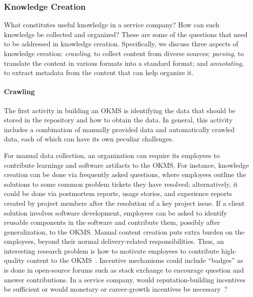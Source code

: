 
\subsubsection{Knowledge Creation}

What constitutes useful knowledge in a service company? How can such knowledge
be collected and organized? These are some of the questions that need to be
addressed in knowledge creation. Specifically, we discuss three aspects of
knowledge creation: \textit{crawling}, to collect content from diverse
sources; \textit{parsing}, to translate the content in various formats into a
standard format; and \textit{annotating}, to extract metadata from the content
that can help organize it.

\vskip -5pt
\paragraph*{Crawling} The first activity in building an OKMS is
identifying the data that should be stored in the repository and how to obtain
the data. In general, this activity includes a combination of manually provided
data and automatically crawled data, each of which can have its own peculiar
challenges.

For manual data collection, an organization can require its employees to
contribute learnings and software artifacts to the OKMS. For instance, knowledge
creation can be done via frequently asked questions, where employees outline the
solutions to some common problem tickets they have resolved; alternatively, it
could be done via postmortem reports, usage stories, and experience
reports~\cite{desouza:2005} created by project members after the resolution of a
key project issue. If a client solution involves software development, employees
can be asked to identify reusable components in the software and contribute
them, possibly after generalization, to the OKMS. Manual content creation puts
extra burden on the employees, beyond their normal delivery-related
responsibilities. Thus, an interesting research problem is how to motivate
employees to contribute high-quality content to the
OKMS~\cite{hendriks1999share}. Incentive mechanisms could include ``badges'' as
is done in open-source forums such as stack exchange to encourage question and
answer contributions. In a service company, would reputation-building incentives
be sufficient or would monetary or career-growth incentives be
necessary~\cite{bartol2002encouraging}?


